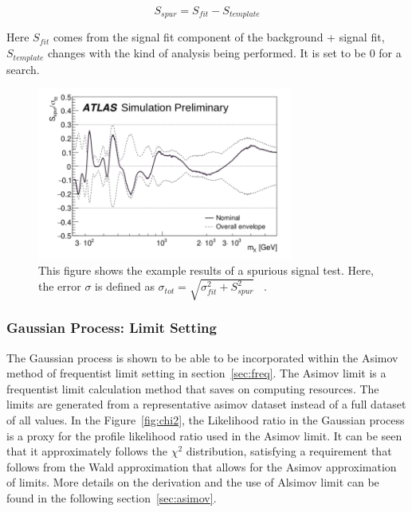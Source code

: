     \begin{equation}
        S_{spur} = S_{fit} - S_{template}
    \end{equation}

    Here $S_{fit}$ comes from the signal fit component of the background + signal fit, $S_{template}$ changes with the kind of analysis being performed. It is set to be 0 for a search. 

    

\begin{figure}[!htb]
    \begin{center}
        \includegraphics[width=0.75\textwidth]{figures/chapter_analysismethod/Spurious}
        \caption{
            This figure shows the example results of a spurious signal test. Here, the error $\sigma$ is defined as $\sigma_{tot} = \sqrt{\sigma^{2}_{fit}+ S_{spur}^{2}}$ ~\cite{ATL-PHYS-PUB-2020-028}.
        }
        \label{spurioussignal}
    \end{center}
\end{figure}
\FloatBarrier

    \subsubsection{Gaussian Process: Limit Setting}

    The Gaussian process is shown to be able to be incorporated within the Asimov method of frequentist limit setting in section~\ref{sec:freq}. The Asimov limit is a frequentist limit calculation method that saves on computing resources. The limits are generated from a representative asimov dataset instead of a full dataset of all values.
    In the Figure~\ref{fig:chi2}, the Likelihood ratio in the Gaussian process is a proxy for the profile likelihood ratio used in the Asimov limit. It can be seen that it approximately follows the $\chi^{2}$ distribution, satisfying a requirement that follows from the Wald approximation that allows for the Asimov approximation of limits.
    More details on the derivation and the use of Alsimov limit can be found in the following section~\ref{sec:asimov}.

